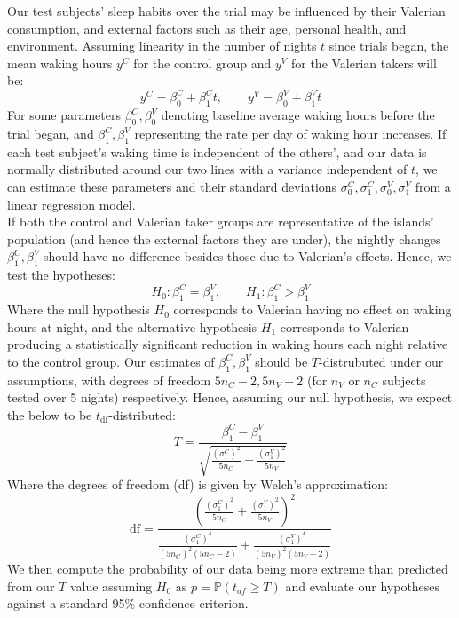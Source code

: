 \documentclass[10pt,preprintnumbers,amsmath,amssymb,floatfix,twocolumn,prl]{revtex4-2}
\begin{document}
Our test subjects' sleep habits over the trial may be influenced by their Valerian consumption, and external factors such as their age, personal health, and environment. Assuming linearity in the number of nights $t$ since trials began, the mean waking hours $y^C$ for the control group and $y^V$ for the Valerian takers will be:
$$y^C = \beta_0^C + \beta_1^C t, \qquad y^V = \beta_0^V + \beta_1^V t$$
For some parameters $\beta_0^C, \beta_0^V$ denoting baseline average waking hours before the trial began, and $\beta_1^C, \beta_1^V$ representing the rate per day of waking hour increases. If each test subject's waking time is independent of the others', and our data is normally distributed around our two lines with a variance independent of $t$, we can estimate these parameters and their standard deviations $\sigma_0^C, \sigma_1^C, \sigma_0^V, \sigma_1^V$ from a linear regression model. \\

If both the control and Valerian taker groups are representative of the islands' population (and hence the external factors they are under), the nightly changes $\beta_1^C, \beta_1^V$ should have no difference besides those due to Valerian's effects. Hence, we test the hypotheses:
$$H_0: \beta_1^C = \beta_1^V, \qquad H_1: \beta_1^C > \beta_1^V$$
Where the null hypothesis $H_0$ corresponds to Valerian having no effect on waking hours at night, and the alternative hypothesis $H_1$ corresponds to Valerian producing a statistically significant reduction in waking hours each night relative to the control group. Our estimates of $\beta_1^C, \beta_1^V$ should be $T$-distrubuted under our assumptions, with degrees of freedom $5n_C - 2, 5n_V - 2$ (for $n_V$ or $n_C$ subjects tested over 5 nights) respectively. Hence, assuming our null hypothesis, we expect the below to be $t_\text{df}$-distributed:
$$T = \frac{\beta_1^C - \beta_1^V}{\sqrt{\frac{(\sigma_1^C)^2}{5n_C} + \frac{(\sigma_1^V)^2}{5n_V}}}$$
Where the degrees of freedom (df) is given by Welch's approximation:
$$\text{df} = \frac{\left(\frac{(\sigma_1^C)^2}{5n_C} + \frac{(\sigma_1^V)^2}{5n_V}\right)^2}{\frac{(\sigma_1^C)^4}{(5n_C)^2 (5n_C - 2)} + \frac{(\sigma_1^V)^4}{(5n_V)^2 (5n_V - 2)}}$$
We then compute the probability of our data being more extreme than predicted from our $T$ value assuming $H_0$ as $p = \mathbb{P}(t_{df} \geq T)$ and evaluate our hypotheses against a standard 95\% confidence criterion. \\
\end{document}

